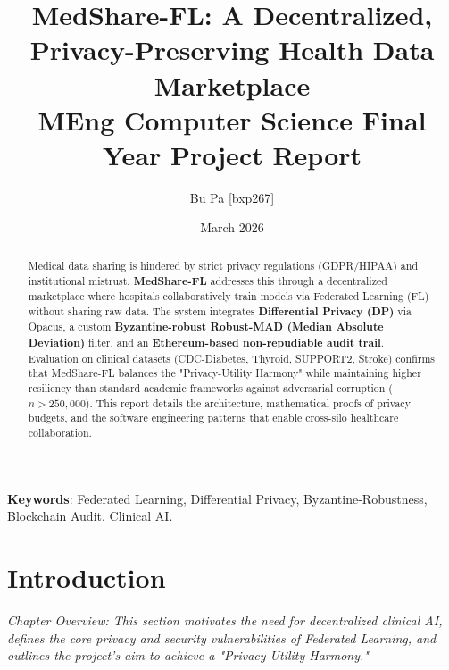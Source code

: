 \documentclass[10pt, a4paper, twocolumn]{article}
\title{\textbf{MedShare-FL: A Decentralized, Privacy-Preserving Health Data Marketplace} \\ \Large MEng Computer Science Final Year Project Report}
\author{Bu Pa [bxp267]}
\date{March 2026}
\begin{document}
\maketitle

\begin{abstract}
Medical data sharing is hindered by strict privacy regulations (GDPR/HIPAA) and institutional mistrust. \textbf{MedShare-FL} addresses this through a decentralized marketplace where hospitals collaboratively train models via Federated Learning (FL) without sharing raw data. The system integrates \textbf{Differential Privacy (DP)} via Opacus, a custom \textbf{Byzantine-robust Robust-MAD (Median Absolute Deviation)} filter, and an \textbf{Ethereum-based non-repudiable audit trail}. Evaluation on clinical datasets (CDC-Diabetes, Thyroid, SUPPORT2, Stroke) confirms that MedShare-FL balances the "Privacy-Utility Harmony" while maintaining higher resiliency than standard academic frameworks against adversarial corruption ($n > 250,000$). This report details the architecture, mathematical proofs of privacy budgets, and the software engineering patterns that enable cross-silo healthcare collaboration.
\end{abstract}

\textbf{Keywords}: Federated Learning, Differential Privacy, Byzantine-Robustness, Blockchain Audit, Clinical AI.

\vspace{0.5cm}
\begin{center}
\end{center}
\vspace{0.5cm}

\section{Introduction}

\textit{Chapter Overview: This section motivates the need for decentralized clinical AI, defines the core privacy and security vulnerabilities of Federated Learning, and outlines the project's aim to achieve a "Privacy-Utility Harmony."}
\end{document}
